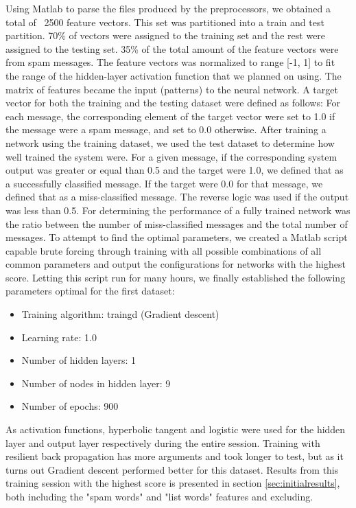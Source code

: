     Using Matlab to parse the files produced by the preprocessors, we obtained
    a total of ~2500 feature vectors. This set was partitioned into a train and
    test partition. 70\% of vectors were assigned to the training set and the
    rest were assigned to the testing set. 35\% of the total amount of the
    feature vectors were from spam messages. The feature vectors was
    normalized to range [-1, 1] to fit the range of the hidden-layer
    activation function that we planned on using. The matrix of features became
    the input (patterns) to the neural network. A target vector for both the
    training and the testing dataset were defined as follows: For each message,
    the corresponding element of the target vector were set to 1.0 if the
    message were a spam message, and set to 0.0 otherwise. 
    After training a network using the training dataset, we used the
    test dataset to determine how well trained the system were. 
    For a given message, if the corresponding system output was greater or
    equal than 0.5 and the target were 1.0, we defined that as a successfully
    classified message. If the target were 0.0 for that message, we defined
    that as a miss-classified message. The reverse logic was used if the output
    was less than 0.5.
    For determining the performance of a fully trained network was the ratio
    between the number of miss-classified messages and the total number of
    messages.
    To attempt to find the optimal parameters, we created a Matlab script
    capable brute forcing through training with all possible combinations of
    all common parameters and output the configurations for networks with the
    highest score. Letting this script run for many hours, we finally
    established the following parameters optimal for the first dataset:
    \begin{itemize}
      \item Training algorithm: traingd (Gradient descent)
      \item Learning rate: 1.0
      \item Number of hidden layers: 1
      \item Number of nodes in hidden layer: 9
      \item Number of epochs: 900
    \end{itemize}
    As activation functions, hyperbolic tangent and logistic were used
    for the hidden layer and output layer respectively during the entire
    session.  Training with resilient back propagation has more arguments and
    took longer to test, but as it turns out Gradient descent performed better
    for this dataset. Results from this training session with the highest score
    is presented in section \ref{sec:initialresults}, both including the "spam
    words" and "list words" features and excluding.

